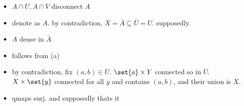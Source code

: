 \begin{pf}[source=Primary Source Material]
    \vspace{-0.275in}
    \begin{itemize}
        \item $A\cap U, A\cap V$ disconnect $A$
        \item denote as $A$.
            by contradiction, $X=\bar{A}\subseteq \bar{U}=U$. supposedly.
        \item $A$ dense in $\bar{A}$
        \item follows from (a)
        \item by contradiction, fix $(a,b)\in U$.
            $\set{a}\times Y$ connected so in $U$.
            $X\times\set{y}$ connected for all $y$ and contains $(a,b)$,
            and their union is $X$.
        \item qmaps surj. and supposedly thats it
    \end{itemize}
    \vspace{-0.4in}
\end{pf}

